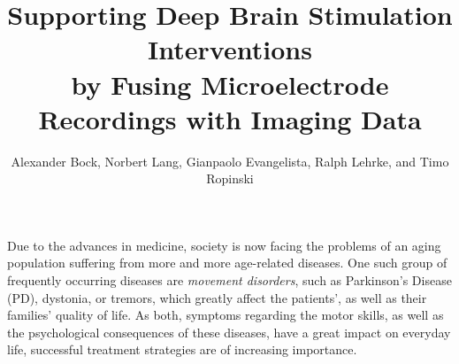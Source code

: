 \documentclass[journal]{vgtc}                %
\title{Supporting Deep Brain Stimulation Interventions \\ by Fusing Microelectrode Recordings with Imaging Data}
\author{Alexander Bock, Norbert Lang, Gianpaolo Evangelista, Ralph Lehrke, and Timo Ropinski}
\begin{document}

\label{sec:introduction}

\maketitle

%
%
Due to the advances in medicine, society is now facing the problems of an aging population suffering from more and more age-related diseases. One such group of frequently occurring diseases are \emph{movement disorders}, such as Parkinson's Disease (PD), dystonia, or tremors, which greatly affect the patients', as well as their families' quality of life. As both, symptoms regarding the motor skills, as well as the psychological consequences of these diseases, have a great impact on everyday life, successful treatment strategies are of increasing importance.
\end{document}
